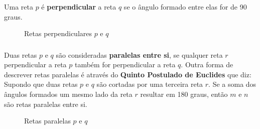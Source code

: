 \documentclass{beamer}
\begin{document}
\begin{frame}[fragile]\frametitle{\subsecname}
    Uma reta $p$ é \textbf{perpendicular} a reta $q$ se o ângulo formado entre elas for de 90 graus.
    \begin{figure}[H]
        \centering
        \caption{Retas perpendiculares $p$ e $q$}
    \end{figure}
\end{frame}


\begin{frame}[fragile]\frametitle{\subsecname}
    Duas retas $p$ e $q$ são consideradas \textbf{paralelas entre si}, se qualquer reta $r$ perpendicular a reta $p$ também for
    perpendicular a reta $q$. Outra forma de descrever retas paralelas é através do \textbf{Quinto Postulado de Euclides}
    que diz: Supondo que duas retas $p$ e $q$ são cortadas por uma terceira reta $r$. Se a soma dos ângulos formados um
    mesmo lado da reta $r$ resultar em 180 graus, então $m$ e $n$ são retas paralelas entre si.

    \begin{figure}[H]
        \centering
        \caption{Retas paralelas $p$ e $q$}
    \end{figure}
\end{frame}

\end{document}
